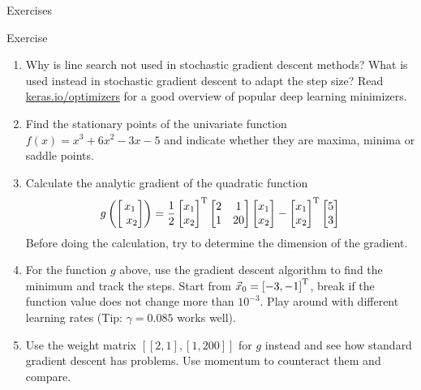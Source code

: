   \begin{frame}{Exercises}
    \begin{exampleblock}{Exercise}
      \begin{enumerate}
        \item Why is line search not used in stochastic gradient descent methods? What is used instead in stochastic gradient descent to adapt the step size?
        Read \url{keras.io/optimizers} for a good overview of popular deep learning minimizers.
        \item Find the stationary points of the univariate function $f(x) = x^3 + 6x^2 - 3x - 5$ and indicate whether they are maxima, minima or saddle points.
        \item Calculate the analytic gradient of the quadratic function
          \begin{equation*}
            g\left( \begin{bmatrix}x_1 \\ x_2 \end{bmatrix} \right)
            = \frac{1}{2}
              \begin{bmatrix} x_1 \\ x_2 \end{bmatrix}^\transp
              \begin{bmatrix} 2 & 1 \\ 1 & 20 \end{bmatrix}
              \begin{bmatrix} x_1 \\ x_2 \end{bmatrix}
              - \begin{bmatrix} x_1 \\ x_2 \end{bmatrix}^\transp
                \begin{bmatrix} 5 \\ 3 \end{bmatrix}
          \end{equation*}
          Before doing the calculation, try to determine the dimension of the gradient.
        \item For the function $g$ above, use the gradient descent algorithm to find the minimum and track the steps. Start from $\vec{x}_0 = \left[-3, -1\right]^{\text{T}}$, break if the function value does not change more than $10^{-3}$.
        Play around with different learning rates (Tip: $\gamma = 0.085$ works well).
        \item Use the weight matrix $[[2, 1], [1, 200]]$ for $g$ instead and see how standard gradient descent has problems. Use momentum to counteract them and compare.
      \end{enumerate}
    \end{exampleblock}
  \end{frame}


